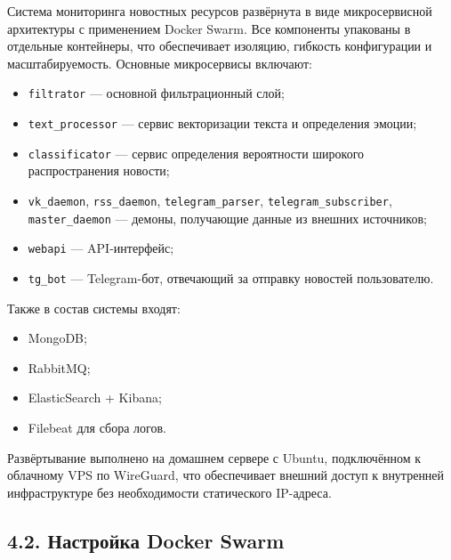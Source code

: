 Система мониторинга новостных ресурсов развёрнута в виде микросервисной
архитектуры с применением Docker Swarm. Все компоненты упакованы в
отдельные контейнеры, что обеспечивает изоляцию, гибкость конфигурации и
масштабируемость. Основные микросервисы включают:

\begin{itemize}
\tightlist
\item
  \texttt{filtrator} --- основной фильтрационный слой;\\
\item
  \texttt{text\_processor} --- сервис векторизации текста и определения
  эмоции;\\
\item
  \texttt{classificator} --- сервис определения вероятности широкого
  распространения новости;\\
\item
  \texttt{vk\_daemon}, \texttt{rss\_daemon}, \texttt{telegram\_parser},
  \texttt{telegram\_subscriber}, \texttt{master\_daemon} --- демоны,
  получающие данные из внешних источников;\\
\item
  \texttt{webapi} --- API-интерфейс;\\
\item
  \texttt{tg\_bot} --- Telegram-бот, отвечающий за отправку новостей
  пользователю.
\end{itemize}

Также в состав системы входят:

\begin{itemize}
\tightlist
\item
  MongoDB;\\
\item
  RabbitMQ;\\
\item
  ElasticSearch + Kibana;\\
\item
  Filebeat для сбора логов.
\end{itemize}

Развёртывание выполнено на домашнем сервере с Ubuntu, подключённом к
облачному VPS по WireGuard, что обеспечивает внешний доступ к внутренней
инфраструктуре без необходимости статического IP-адреса.

\hypertarget{ux43dux430ux441ux442ux440ux43eux439ux43aux430-docker-swarm}{%
\subsection{4.2. Настройка Docker
Swarm}\label{ux43dux430ux441ux442ux440ux43eux439ux43aux430-docker-swarm}}

